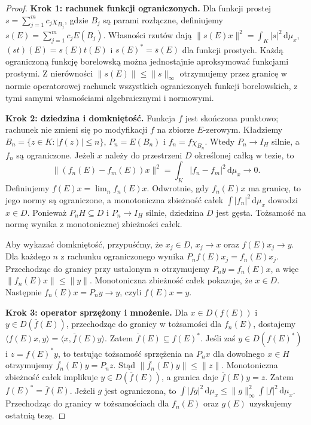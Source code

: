 \documentclass[11pt,a4paper]{article}
\numberwithin{equation}{section}
\theoremstyle{plain}
\theoremstyle{definition}
\theoremstyle{remark}
\begin{document}
\begin{proof}
\textbf{Krok 1: rachunek funkcji ograniczonych.}
Dla funkcji prostej $s=\sum_{j=1}^m c_j\chi_{B_j}$, gdzie
$B_j$ są parami rozłączne, definiujemy
$s(E)=\sum_{j=1}^m c_jE(B_j)$.
Własności rzutów dają
$\|s(E)x\|^2=\int_K|s|^2\,\mathrm d\mu_x$,
$(st)(E)=s(E)t(E)$ i $s(E)^*=\overline s(E)$
dla funkcji prostych. Każdą ograniczoną funkcję borelowską
można jednostajnie aproksymować funkcjami prostymi.
Z nierówności $\|s(E)\|\le\|s\|_\infty$ otrzymujemy
przez granicę w normie operatorowej rachunek wszystkich
ograniczonych funkcji borelowskich, z tymi samymi
własnościami algebraicznymi i normowymi.

\textbf{Krok 2: dziedzina i domkniętość.}
Funkcja $f$ jest skończona punktowo; rachunek
nie zmieni się po modyfikacji $f$ na zbiorze $E$-zerowym.
Kładziemy $B_n=\{z\in K:|f(z)|\le n\}$,
$P_n=E(B_n)$ i $f_n=f\chi_{B_n}$.
Wtedy $P_n\to I_H$ silnie, a $f_n$ są ograniczone.
Jeżeli $x$ należy do przestrzeni $D$ określonej całką w tezie,
to
\[
 \|(f_n(E)-f_m(E))x\|^2
 =\int_K|f_n-f_m|^2\,\mathrm d\mu_x\longrightarrow0.
\]
Definiujemy $f(E)x=\lim_n f_n(E)x$.
Odwrotnie, gdy $f_n(E)x$ ma granicę, to jego normy są
ograniczone, a monotoniczna zbieżność całek
$\int|f_n|^2\,\mathrm d\mu_x$ dowodzi $x\in D$.
Ponieważ $P_nH\subseteq D$ i $P_n\to I_H$ silnie,
dziedzina $D$ jest gęsta. Tożsamość na normę wynika
z monotonicznej zbieżności całek.

Aby wykazać domkniętość, przypuśćmy, że $x_j\in D$,
$x_j\to x$ oraz $f(E)x_j\to y$. Dla każdego $n$
z rachunku ograniczonego wynika
$P_nf(E)x_j=f_n(E)x_j$.
Przechodząc do granicy przy ustalonym $n$ otrzymujemy
$P_ny=f_n(E)x$, a więc $\|f_n(E)x\|\le\|y\|$.
Monotoniczna zbieżność całek pokazuje, że $x\in D$.
Następnie $f_n(E)x=P_ny\to y$, czyli $f(E)x=y$.

\textbf{Krok 3: operator sprzężony i mnożenie.}
Dla $x\in D(f(E))$ i $y\in D(\overline f(E))$,
przechodząc do granicy w tożsamości dla $f_n(E)$,
dostajemy $\langle f(E)x,y\rangle
=\langle x,\overline f(E)y\rangle$.
Zatem $\overline f(E)\subseteq f(E)^*$.
Jeśli zaś $y\in D(f(E)^*)$ i $z=f(E)^*y$, to
testując tożsamość sprzężenia na $P_nx$ dla dowolnego
$x\in H$ otrzymujemy
$\overline{f_n}(E)y=P_nz$.
Stąd $\|\overline{f_n}(E)y\|\le\|z\|$.
Monotoniczna zbieżność całek implikuje
$y\in D(\overline f(E))$, a granica daje
$\overline f(E)y=z$. Zatem $f(E)^*=\overline f(E)$.
Jeżeli $g$ jest ograniczona, to
$\int|fg|^2\,\mathrm d\mu_x\le
\|g\|_\infty^2\int|f|^2\,\mathrm d\mu_x$.
Przechodząc do granicy w tożsamościach dla
$f_n(E)$ oraz $g(E)$ uzyskujemy ostatnią tezę.
\end{proof}
\end{document}
